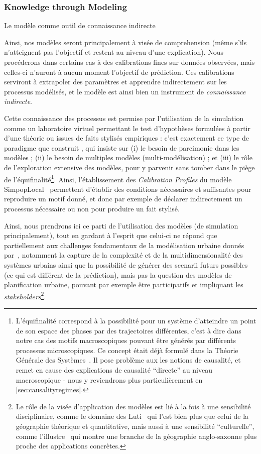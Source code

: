 \subsubsection{Knowledge through Modeling}{Le modèle comme outil de connaissance indirecte}



Ainsi, nos modèles seront principalement à visée de comprehension (même s'ils n'atteignent pas l'objectif et restent au niveau d'une explication). Nous procéderons dans certains cas à des calibrations fines sur données observées, mais celles-ci n'auront à aucun moment l'objectif de prédiction. Ces calibrations serviront à extrapoler des paramètres et apprendre indirectement sur les processus modélisés, et le modèle est ainsi bien un instrument de \emph{connaissance indirecte}.

Cette connaissance des processus est permise par l'utilisation de la simulation comme un laboratoire virtuel permettant le test d'hypothèses formulées à partir d'une théorie ou issues de faits stylisés empiriques : c'est exactement ce type de paradigme que construit \cite{pumain2017urban}, qui insiste sur (i) le besoin de parcimonie dans les modèles ; (ii) le besoin de multiples modèles (multi-modélisation) ; et (iii) le rôle de l'exploration extensive des modèles, pour y parvenir sans tomber dans le piège de l'équifinalité\footnote{L'équifinalité correspond à la possibilité pour un système d'atteindre un point de son espace des phases par des trajectoires différentes, c'est à dire dans notre cas des motifs macroscopiques pouvant être générés par différents processus microscopiques. Ce concept était déjà formulé dans la Théorie Générale des Systèmes~\cite{von1972history}. Il pose problème aux les notions de causalité, et remet en cause des explications de causalité ``directe'' au niveau macroscopique - nous y reviendrons plus particulièrement en \ref{sec:causalityregimes}.}. Ainsi, l'établissement des \emph{Calibration Profiles} du modèle SimpopLocal~\cite{reuillon2015} permettent d'établir des conditions nécessaires et suffisantes pour reproduire un motif donné, et donc par exemple de déclarer indirectement un processus nécessaire ou non pour produire un fait stylisé.

Ainsi, nous prendrons ici ce parti de l'utilisation des modèles (de simulation principalement), tout en gardant à l'esprit que celui-ci ne répond que partiellement aux challenges fondamentaux de la modélisation urbaine donnés par~\cite{perez2016agent}, notamment la capture de la complexité et de la multidimensionalité des systèmes urbains ainsi que la possibilité de générer des scenarii futurs possibles (ce qui est différent de la prédiction), mais pas la question des modèles de planification urbaine, pouvant par exemple être participatifs et impliquant les \emph{stakeholders}\footnote{Le rôle de la visée d'application des modèles est lié à la fois à une sensibilité disciplinaire, comme le domaine des Luti~\cite{wegener2004land} qui l'est bien plus que celui de la géographie théorique et quantitative, mais aussi à une sensibilité ``culturelle'', comme l'illustre~\cite{batty2013new} qui montre une branche de la géographie anglo-saxonne plus proche des applications concrètes.}.



